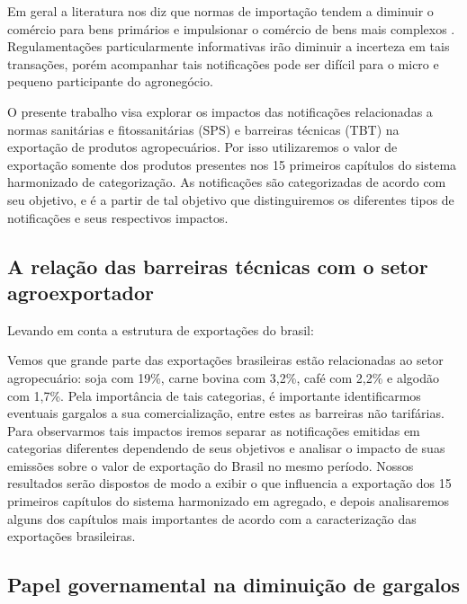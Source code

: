\documentclass[12pt, a4paper]{article}
\begin{document}
Em geral a literatura  nos diz que normas de importação tendem a diminuir o comércio para bens primários e impulsionar o comércio de bens mais complexos \cite{moenius}. Regulamentações particularmente informativas irão diminuir a incerteza em tais transações, porém acompanhar tais notificações pode ser difícil para o micro e pequeno participante do agronegócio. 

O presente trabalho visa explorar os impactos das notificações relacionadas a normas sanitárias e fitossanitárias  (SPS) e barreiras técnicas  (TBT) na exportação de produtos agropecuários. Por isso utilizaremos o valor de exportação somente dos produtos presentes nos 15 primeiros capítulos do sistema harmonizado de categorização. As notificações são categorizadas de acordo com seu objetivo, e é a partir de tal objetivo que distinguiremos os diferentes tipos de notificações e seus respectivos impactos.

\subsection{A relação das barreiras técnicas com o setor agroexportador} \label{barreiras}

Levando em conta a estrutura de exportações do brasil:



Vemos que grande parte das exportações brasileiras estão relacionadas ao setor agropecuário: soja com 19\%, carne bovina com 3,2\%, café com 2,2\% e algodão com 1,7\%. Pela importância de tais categorias, é importante identificarmos eventuais gargalos a sua comercialização, entre estes as barreiras não tarifárias. Para observarmos  tais impactos iremos separar as notificações emitidas em categorias diferentes dependendo de seus objetivos e analisar o impacto de suas emissões sobre o valor de exportação do Brasil no mesmo período. Nossos resultados serão dispostos de modo a exibir o que influencia a exportação dos 15 primeiros capítulos do sistema harmonizado em agregado, e depois analisaremos alguns dos capítulos mais importantes de acordo com a caracterização das exportações brasileiras.

\newpage

\subsection{Papel governamental na diminuição de gargalos}


\end{document}
